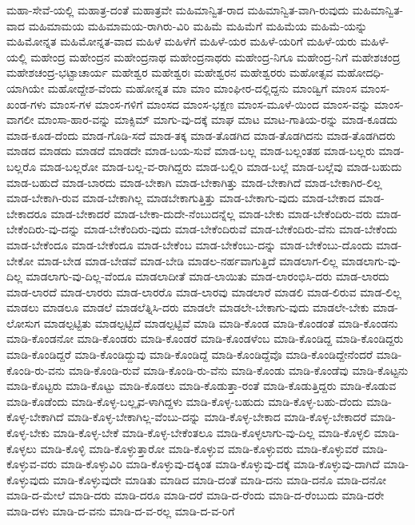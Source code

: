 {ಮಹಾ-ಸೇವೆ-ಯಲ್ಲಿ
ಮಹಾತ್ರ-ದಂತೆ
ಮಹಾತ್ರವೇ
ಮಹಿಮಾನ್ವಿತ-ರಾದ
ಮಹಿಮಾನ್ವಿತ-ವಾಗಿ-ರುವುದು
ಮಹಿಮಾನ್ವಿತ-ವಾದ
ಮಹಿಮಾಮಯ
ಮಹಿಮಾಮಯ-ರಾಗಿರು-ವಿರಿ
ಮಹಿಮೆ
ಮಹಿಮೆಗೆ
ಮಹಿಮೆಯ
ಮಹಿಮೆ-ಯನ್ನು
ಮಹಿಮೋನ್ನತ
ಮಹಿಮೋನ್ನತ-ವಾದ
ಮಹಿಳೆ
ಮಹಿಳೆಗೆ
ಮಹಿಳೆ-ಯರ
ಮಹಿಳೆ-ಯರಿಗೆ
ಮಹಿಳೆ-ಯರು
ಮಹಿಳೆ-ಯಲ್ಲಿ
ಮಹೇಂದ್ರ
ಮಹೇಂದ್ರನ
ಮಹೇಂದ್ರನಾಥ
ಮಹೇಂದ್ರನಾಥರು
ಮಹೇಂದ್ರ-ನಿಗೂ
ಮಹೇಂದ್ರ-ನಿಗೆ
ಮಹೇಶಚಂದ್ರ
ಮಹೇಶಚಂದ್ರ-ಭಟ್ಟಾಚಾರ್ಯ
ಮಹೇಶ್ವರ
ಮಹೇಶ್ವರಃ
ಮಹೇಶ್ವರನ
ಮಹೇಶ್ವರರು
ಮಹೋತ್ಸವ
ಮಹೋದಧಿ-ಯಾಗಿಯೇ
ಮಹೋದ್ದೇಶ-ವೆಂದು
ಮಹೋನ್ನತ
ಮಾ
ಮಾಂ
ಮಾಂಘೀರ-ದಲ್ಲಿದ್ದನು
ಮಾಂಡ್ವಿಗೆ
ಮಾಂಸ
ಮಾಂಸ-ಖಂಡ-ಗಳು
ಮಾಂಸ-ಗಳ
ಮಾಂಸ-ಗಳಿಗೆ
ಮಾಂಸದ
ಮಾಂಸ-ಭಕ್ಷಣ
ಮಾಂಸ-ಮೂಳೆ-ಯಿಂದ
ಮಾಂಸ-ವನ್ನು
ಮಾಂಸ-ವಾಗಲೀ
ಮಾಂಸಾ-ಹಾರ-ವನ್ನು
ಮಾಕ್ಸಿಮ್
ಮಾಗು-ವು-ದಕ್ಕೆ
ಮಾಘ
ಮಾಟ
ಮಾಟ-ಗಾತಿಯ-ರನ್ನು
ಮಾಡ-ಕೂಡದು
ಮಾಡ-ಕೂಡ-ದೆಂದು
ಮಾಡ-ಗೊಡಿ-ಸದೆ
ಮಾಡ-ತಕ್ಕ
ಮಾಡ-ತೊಡಗಿದ
ಮಾಡ-ತೊಡಗಿದನು
ಮಾಡ-ತೊಡಗಿದರು
ಮಾಡದ
ಮಾಡದು
ಮಾಡದೆ
ಮಾಡದೇ
ಮಾಡ-ಬಯ-ಸುವೆ
ಮಾಡ-ಬಲ್ಲ
ಮಾಡ-ಬಲ್ಲಂತಹ
ಮಾಡ-ಬಲ್ಲರು
ಮಾಡ-ಬಲ್ಲರೊ
ಮಾಡ-ಬಲ್ಲರೋ
ಮಾಡ-ಬಲ್ಲ-ವ-ರಾಗಿದ್ದರು
ಮಾಡ-ಬಲ್ಲಿರಿ
ಮಾಡ-ಬಲ್ಲೆ
ಮಾಡ-ಬಲ್ಲೆವು
ಮಾಡ-ಬಹುದು
ಮಾಡ-ಬಹುದೆ
ಮಾಡ-ಬಾರದು
ಮಾಡ-ಬೇಕಾಗಿ
ಮಾಡ-ಬೇಕಾಗಿತ್ತು
ಮಾಡ-ಬೇಕಾಗಿದೆ
ಮಾಡ-ಬೇಕಾಗಿರ-ಲಿಲ್ಲ
ಮಾಡ-ಬೇಕಾಗಿ-ರುವ
ಮಾಡ-ಬೇಕಾಗಿಲ್ಲ
ಮಾಡಬೇಕಾಗುತ್ತಿತ್ತು
ಮಾಡ-ಬೇಕಾಗು-ವುದು
ಮಾಡ-ಬೇಕಾದ
ಮಾಡ-ಬೇಕಾದರೂ
ಮಾಡ-ಬೇಕಾದರೆ
ಮಾಡ-ಬೇಕಾ-ದುದೇ-ನೆಂಬುದನ್ನೆಲ್ಲ
ಮಾಡ-ಬೇಕು
ಮಾಡ-ಬೇಕೆಂದಿರು-ವರು
ಮಾಡ-ಬೇಕೆಂದಿರು-ವು-ದನ್ನು
ಮಾಡ-ಬೇಕೆಂದಿರು-ವುದು
ಮಾಡ-ಬೇಕೆಂದಿರುವೆ
ಮಾಡ-ಬೇಕೆಂದಿರು-ವೆನು
ಮಾಡ-ಬೇಕೆಂದು
ಮಾಡ-ಬೇಕೆಂದೂ
ಮಾಡ-ಬೇಕೆಂದೂ
ಮಾಡ-ಬೇಕೆಂಬ
ಮಾಡ-ಬೇಕೆಂಬು-ದನ್ನು
ಮಾಡ-ಬೇಕೆಂಬು-ದೊಂದು
ಮಾಡ-ಬೇಕೋ
ಮಾಡ-ಬೇಡ
ಮಾಡ-ಬೇಡವೆ
ಮಾಡ-ಬೇಡಿ
ಮಾಡಲ-ನರ್ಹವಾಗುತ್ತಿದೆ
ಮಾಡಲಾಗ-ಲಿಲ್ಲ
ಮಾಡಲಾಗು-ವು-ದಿಲ್ಲ
ಮಾಡಲಾಗು-ವು-ದಿಲ್ಲ-ವೆಂದೂ
ಮಾಡಲಾದೀತೆ
ಮಾಡ-ಲಾಯಿತು
ಮಾಡ-ಲಾರಂಭಿಸಿ-ದರು
ಮಾಡ-ಲಾರದು
ಮಾಡ-ಲಾರದೆ
ಮಾಡ-ಲಾರರು
ಮಾಡ-ಲಾರರೊ
ಮಾಡ-ಲಾರವು
ಮಾಡಲಾರೆ
ಮಾಡಲಿ
ಮಾಡ-ಲಿರುವ
ಮಾಡ-ಲಿಲ್ಲ
ಮಾಡಲು
ಮಾಡಲೂ
ಮಾಡಲೆ
ಮಾಡಲೆತ್ನಿಸಿ-ದರು
ಮಾಡಲೇ
ಮಾಡಲೇ-ಬೇಕಾಗು-ವುದು
ಮಾಡಲೇ-ಬೇಕು
ಮಾಡ-ಲೋಸುಗ
ಮಾಡಲ್ಪಟ್ಟಿತು
ಮಾಡಲ್ಪಟ್ಟಿದೆ
ಮಾಡಲ್ಪಟ್ಟಿವೆ
ಮಾಡಿ
ಮಾಡಿ-ಕೊಂಡ
ಮಾಡಿ-ಕೊಂಡಂತೆ
ಮಾಡಿ-ಕೊಂಡನು
ಮಾಡಿ-ಕೊಂಡನೋ
ಮಾಡಿ-ಕೊಂಡರು
ಮಾಡಿ-ಕೊಂಡರೆ
ಮಾಡಿ-ಕೊಂಡಳೆಂಬ
ಮಾಡಿ-ಕೊಂಡಿದ್ದ
ಮಾಡಿ-ಕೊಂಡಿದ್ದರು
ಮಾಡಿ-ಕೊಂಡಿದ್ದರೆ
ಮಾಡಿ-ಕೊಂಡಿದ್ದುವು
ಮಾಡಿ-ಕೊಂಡಿದ್ದೆ
ಮಾಡಿ-ಕೊಂಡಿದ್ದೆವೊ
ಮಾಡಿ-ಕೊಂಡಿದ್ದೇನೆಂದರೆ
ಮಾಡಿ-ಕೊಂಡಿ-ರು-ವನು
ಮಾಡಿ-ಕೊಂಡಿ-ರುವೆ
ಮಾಡಿ-ಕೊಂಡಿ-ರು-ವೆನು
ಮಾಡಿ-ಕೊಂಡು
ಮಾಡಿ-ಕೊಂಡೆವು
ಮಾಡಿ-ಕೊಟ್ಟನು
ಮಾಡಿ-ಕೊಟ್ಟರು
ಮಾಡಿ-ಕೊಟ್ಟು
ಮಾಡಿ-ಕೊಡಲು
ಮಾಡಿ-ಕೊಡುತ್ತಾ-ರಂತೆ
ಮಾಡಿ-ಕೊಡುತ್ತಿದ್ದರು
ಮಾಡಿ-ಕೊಡುವ
ಮಾಡಿ-ಕೊಡೆಂದು
ಮಾಡಿ-ಕೊಳ್ಳ-ಬಲ್ಲೃವ-ಳಾಗಿದ್ದಳು
ಮಾಡಿ-ಕೊಳ್ಳ-ಬಹುದು
ಮಾಡಿ-ಕೊಳ್ಳ-ಬಹು-ದೆಂದು
ಮಾಡಿ-ಕೊಳ್ಳ-ಬೇಕಾಗಿದೆ
ಮಾಡಿ-ಕೊಳ್ಳ-ಬೇಕಾಗಿಲ್ಲ-ವೆಂಬು-ದನ್ನು
ಮಾಡಿ-ಕೊಳ್ಳ-ಬೇಕಾದ
ಮಾಡಿ-ಕೊಳ್ಳ-ಬೇಕಾದರೆ
ಮಾಡಿ-ಕೊಳ್ಳ-ಬೇಕು
ಮಾಡಿ-ಕೊಳ್ಳ-ಬೇಕೆ
ಮಾಡಿ-ಕೊಳ್ಳ-ಬೇಕೆಂತಲೂ
ಮಾಡಿ-ಕೊಳ್ಳಲಾಗು-ವು-ದಿಲ್ಲ
ಮಾಡಿ-ಕೊಳ್ಳಲಿ
ಮಾಡಿ-ಕೊಳ್ಳಲು
ಮಾಡಿ-ಕೊಳ್ಳಿ
ಮಾಡಿ-ಕೊಳ್ಳುತ್ತಾರೋ
ಮಾಡಿ-ಕೊಳ್ಳುವ
ಮಾಡಿ-ಕೊಳ್ಳುವರು
ಮಾಡಿ-ಕೊಳ್ಳುವರೆ
ಮಾಡಿ-ಕೊಳ್ಳುವ-ವರು
ಮಾಡಿ-ಕೊಳ್ಳುವಿರಿ
ಮಾಡಿ-ಕೊಳ್ಳುವು-ದಕ್ಕಿಂತ
ಮಾಡಿ-ಕೊಳ್ಳುವು-ದಕ್ಕೆ
ಮಾಡಿ-ಕೊಳ್ಳುವು-ದಾಗಿದೆ
ಮಾಡಿ-ಕೊಳ್ಳುವುದು
ಮಾಡಿ-ಕೊಳ್ಳುವುದೇ
ಮಾಡಿತು
ಮಾಡಿದ
ಮಾಡಿ-ದಂತೆ
ಮಾಡಿ-ದನು
ಮಾಡಿ-ದನೊ
ಮಾಡಿ-ದನೋ
ಮಾಡಿ-ದ-ಮೇಲೆ
ಮಾಡಿ-ದರು
ಮಾಡಿ-ದರೂ
ಮಾಡಿ-ದರೆ
ಮಾಡಿ-ದ-ರೆಂದು
ಮಾಡಿ-ದ-ರೆಂಬುದು
ಮಾಡಿ-ದರೇ
ಮಾಡಿ-ದಳು
ಮಾಡಿ-ದ-ವನು
ಮಾಡಿ-ದ-ವ-ರಲ್ಲ
ಮಾಡಿ-ದ-ವ-ರಿಗೆ
}
